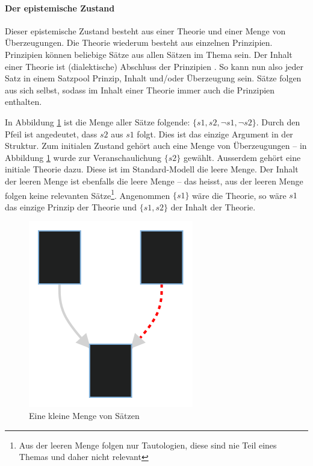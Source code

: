 \documentclass{article}
\begin{document}
\paragraph{Der epistemische Zustand} Dieser epistemische Zustand besteht aus einer Theorie und einer Menge von Überzeugungen. Die Theorie wiederum besteht aus einzelnen Prinzipien. Prinzipien können beliebige Sätze aus allen Sätzen im Thema sein. Der Inhalt einer Theorie ist (dialektische) Abschluss der Prinzipien \parencite[vgl.][S.~464]{beisbart_making_2021}. So kann nun also jeder Satz in einem Satzpool Prinzip, Inhalt und/oder Überzeugung sein. Sätze folgen aus sich selbst, sodass im Inhalt einer Theorie immer auch die Prinzipien enthalten.

In Abbildung \ref{fig:smallset} ist die Menge aller Sätze folgende: $\{s1,s2,\neg s1, \neg s2\}$. Durch den Pfeil ist angedeutet, dass $s2$ aus $s1$ folgt. Dies ist das einzige Argument in der Struktur. Zum initialen Zustand gehört auch eine Menge von Überzeugungen -- in Abbildung \ref{fig:smallset} wurde zur Veranschaulichung $\{s2\}$ gewählt. Ausserdem gehört eine initiale Theorie dazu. Diese ist im Standard-Modell die leere Menge. Der Inhalt der leeren Menge ist ebenfalls die leere Menge -- das heisst, aus der leeren Menge folgen keine relevanten Sätze\footnote{Aus der leeren Menge folgen nur Tautologien, diese sind nie Teil eines Themas und daher nicht relevant}. Angenommen $\{s1\}$ wäre die Theorie, so wäre $s1$ das einzige Prinzip der Theorie und $\{s1, s2\}$ der Inhalt der Theorie.

\begin{figure}[ht]
  \centering
  \includegraphics{figure1}
  \caption{Eine kleine Menge von Sätzen\label{fig:smallset}}
\end{figure}
\end{document}
